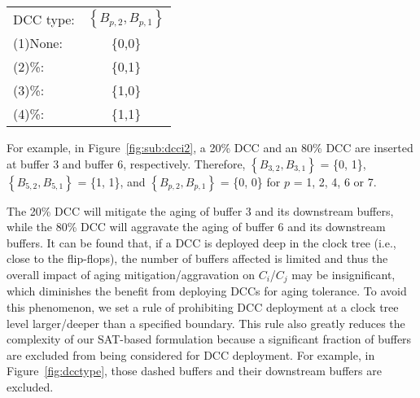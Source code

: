 \begin{tabular}{ l c }
  DCC type: & $\left\{B_{p,2},B_{p,1}\right\}$ \\
  (1)\quad None: & \{0,0\} \\
  (2)\quad 20\%: &  \{0,1\} \\
  (3)\quad 40\%: &  \{1,0\} \\
  (4)\quad 80\%: &  \{1,1\} \\
\end{tabular}


For example, in Figure~\ref{fig:sub:dcci2}, a 20\% DCC and an 80\% DCC are inserted at buffer 3 and buffer 6, respectively. Therefore, $\left\{B_{3,2}, B_{3,1}\right\}$ = \{0, 1\}, $\left\{B_{5,2}, B_{5,1}\right\}$ = \{1, 1\}, and $\left\{B_{p,2}, B_{p,1}\right\}$ = \{0, 0\} for $p$ = 1, 2, 4, 6 or 7.

The 20\% DCC will mitigate the aging of buffer 3 and its downstream buffers, while the 80\% DCC will aggravate the aging of buffer 6 and its downstream buffers. It can be found that, if a DCC is deployed deep in the clock tree (i.e., close to the flip-flops), the number of buffers affected is limited and thus the overall impact of aging mitigation/aggravation on $C_i$/$C_j$ may be insignificant, which diminishes the benefit from deploying DCCs for aging tolerance. To avoid this phenomenon, we set a rule of prohibiting DCC deployment at a clock tree level larger/deeper than a specified boundary. This rule also greatly reduces the complexity of our SAT-based formulation because a significant fraction of buffers are excluded from being considered for DCC deployment. For example, in Figure~\ref{fig:dcctype}, those dashed buffers and their downstream buffers are excluded. 
